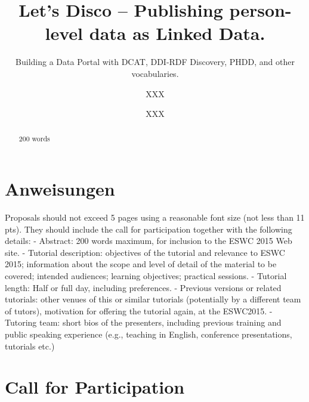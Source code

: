 \documentclass{llncs}
\newcommand{\bz}[1]{\todo[size=\small, color=orange!40]{\textbf{Ben:} #1}}
\begin{document}
%
%
\title{Let’s Disco – Publishing person-level data as Linked Data.}
\subtitle{Building a Data Portal with DCAT, DDI-RDF Discovery, PHDD, and other vocabularies.\bz{Ben's Kommentar}
}
%
%
\author{XXX \and XXX}
%
%

\maketitle              %

\begin{abstract}
200 words

\end{abstract}
%

\section{Anweisungen}

Proposals should not exceed 5 pages using a reasonable font size (not less than 11 pts). They should include the call for participation together with the following details:
- Abstract: 200 words maximum, for inclusion to the ESWC 2015 Web site.
- Tutorial description: objectives of the tutorial and relevance to ESWC 2015; information about the scope and level of detail of the material to be covered; intended audiences; learning objectives; practical sessions.
- Tutorial length: Half or full day, including preferences.
- Previous versions or related tutorials: other venues of this or similar tutorials (potentially by a different team of tutors), motivation for offering the tutorial again, at the ESWC2015.
- Tutoring team: short bios of the presenters, including previous training and public speaking experience (e.g., teaching in English, conference presentations, tutorials etc.)

\section{Call for Participation}
\end{document}
